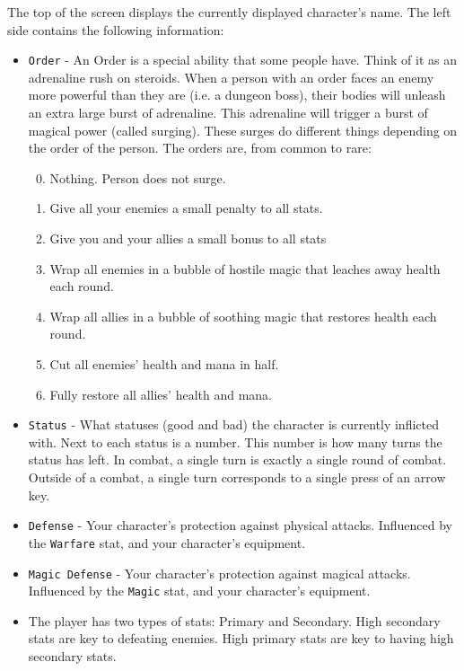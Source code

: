 \documentclass{report}
\begin{document}
The top of the screen displays the currently displayed character's name. The left 
side contains the following information:

\begin{itemize}
    \item \verb|Order| - An Order is a special ability that some people have. Think
    of it as an adrenaline rush on steroids. When a person with an order faces
    an enemy more powerful than they are (i.e. a dungeon boss), their bodies will unleash an extra large
    burst of adrenaline. This adrenaline will trigger a burst of magical power 
    (called surging). These surges do different things depending on the order of
    the person. 
    The orders are, from common to rare:
    \begin{enumerate}
        \setcounter{enumi}{-1}
        \item Nothing. Person does not surge.
        \item Give all your enemies a small penalty to all stats.
        \item Give you and your allies a small bonus to all stats
        \item Wrap all enemies in a bubble of hostile magic that leaches away health 
        each round.
        \item Wrap all allies in a bubble of soothing magic that restores health
        each round.
        \item Cut all enemies' health and mana in half.
        \item Fully restore all allies' health and mana.
    \end{enumerate}
    \item \verb|Status| - What statuses (good and bad) the character is currently 
    inflicted with. Next to each status is a number. This number is how 
    many turns the status has left. In combat, a single turn is exactly a single
    round of combat. Outside of a combat, a single turn corresponds to a single
    press of an arrow key.
    \item \verb|Defense| - Your character's protection against physical attacks. 
    Influenced by the \verb|Warfare| stat, and your character's equipment.
    \item \verb|Magic Defense| - Your character's protection against magical 
    attacks.
    Influenced by the \verb|Magic| stat, and your character's equipment.
    \item The player has two types of stats: Primary and Secondary. High secondary stats are key to defeating enemies. High primary stats are key to having high secondary stats.

\end{itemize}
\end{document}
